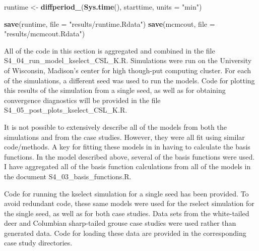 \documentclass[11pt,]{article}
\newenvironment{Shaded}{\begin{snugshade}}{\end{snugshade}}
\newcommand{\KeywordTok}[1]{\textcolor[rgb]{0.13,0.29,0.53}{\textbf{#1}}}
\newcommand{\DataTypeTok}[1]{\textcolor[rgb]{0.13,0.29,0.53}{#1}}
\newcommand{\StringTok}[1]{\textcolor[rgb]{0.31,0.60,0.02}{#1}}
\newcommand{\NormalTok}[1]{#1}
\begin{document}
\begin{Shaded}
\begin{Highlighting}[]
\NormalTok{runtime <-}\StringTok{ }\KeywordTok{diffperiod_}\NormalTok{(}\KeywordTok{Sys.time}\NormalTok{(), starttime, }\DataTypeTok{units =} \StringTok{"min"}\NormalTok{)}

\KeywordTok{save}\NormalTok{(runtime, }\DataTypeTok{file =} \StringTok{"results/runtime.Rdata"}\NormalTok{)}
\KeywordTok{save}\NormalTok{(mcmcout, }\DataTypeTok{file =} \StringTok{"results/mcmcout.Rdata"}\NormalTok{)}
\end{Highlighting}
\end{Shaded}

All of the code in this section is aggregated and combined in the file
S4\_04\_run\_model\_kselect\_CSL\_K.R. Simulations were run on the
University of Wisconsin, Madison's center for high though-put computing
cluster. For each of the simulations, a different seed was used to run
the models. Code for plotting this results of the simulation from a
single seed, as well as for obtaining convergence diagnostics will be
provided in the file S4\_05\_post\_plots\_kselect\_CSL\_K.R.

It is not possible to extensively describe all of the models from both
the simulations and from the case studies. However, they were all fit
using similar code/methods. A key for fitting these models in in having
to calculate the basis functions. In the model described above, several
of the basis functions were used. I have aggregated all of the basis
function calculations from all of the models in the document
S4\_03\_basis\_functions.R.

Code for running the kselect simulation for a single seed has been
provided. To avoid redundant code, these same models were used for the
rselect simulation for the single seed, as well as for both case
studies. Data sets from the white-tailed deer and Columbian sharp-tailed
grouse case studies were used rather than generated data. Code for
loading these data are provided in the corresponding case study
directories.
\end{document}
